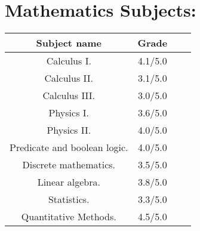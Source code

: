 \documentclass[a4paper,10pt]{article} %
\begin{document}
\section{Mathematics Subjects:}
\begin {center}
\begin{tabular}{| c | c | l | l |}
 \hline
 \textbf{Subject name} & \textbf{Grade}\\ \hline
Calculus I. & 4.1/5.0\\
Calculus II. & 3.1/5.0\\
Calculus III. & 3.0/5.0\\
Physics I. & 3.6/5.0\\
Physics II. & 4.0/5.0\\
Predicate and boolean logic. & 4.0/5.0\\
Discrete mathematics. & 3.5/5.0\\
Linear algebra. & 3.8/5.0\\
Statistics. & 3.3/5.0\\
Quantitative Methods. & 4.5/5.0\\
 \hline
\end{tabular}
\end{center}
\end{document}
